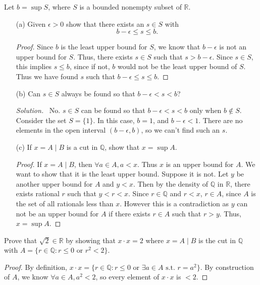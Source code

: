 \documentclass[12pt]{article}
\newcommand{\bbQ}{\mathbb{Q}}
\newcommand{\bbR}{\mathbb{R}}
\renewcommand{\_}[1]{\underline{ #1 }}
\theoremstyle{definition}
\newenvironment{exercise}[1]
  {\renewcommand\theinnercustomthm{#1}\innercustomthm}
  {\endinnercustomthm}
\newenvironment{solution}{\par\noindent\textit{Solution.}\ }{\par}
\numberwithin{equation}{subsection}
\begin{document}
\begin{exercise}{13}
    Let $b = \sup S$, where $S$ is a bounded nonempty subset of $\bbR$. 
    \begin{itemize}
        \item [(a)] Given $\epsilon > 0$ show that there exists an $s \in S$ with $$b - \epsilon \le s \le b.$$
        \begin{proof}
            Since $b$ is the least upper bound for $S$, we know that $b - \epsilon$ is not an upper bound for $S$. Thus, there exists $s \in S$ such that $s > b - \epsilon$. Since $s \in S$, this implies $s \le b$, since if not, $b$ would not be the least upper bound of $S$. Thus we have found $s$ such that $b - \epsilon \le s \le b$. 
        \end{proof}
        \item [(b)] Can $s \in S$ always be found so that $b - \epsilon < s < b$?
        \begin{solution}
            No. $s \in S$ can be found so that $b - \epsilon < s < b$ only when $b \notin S$. Consider the set $S = \{ 1 \}$. In this case, $b = 1$, and $b - \epsilon < 1$. There are no elements in the open interval $(b - \epsilon, b)$, so we can't find such an $s$. 
        \end{solution}
        \item [(c)] If $x = A \mid B$ is a cut in $\bbQ$, show that $x = \sup A$. 
        \begin{proof}
            If $x = A \mid B$, then $\forall a \in A, a < x$. Thus $x$ is an upper bound for $A$. We want to show that it is the least upper bound. Suppose it is not. Let $y$ be another upper bound for $A$ and $y < x$. Then by the density of $\bbQ$ in $\bbR$, there exists rational $r$ such that $y < r < x$. Since $r \in \bbQ$ and $r < x$, $r \in A$, since $A$ is the set of all rationals less than $x$. However this is a contradiction as $y$ can not be an upper bound for $A$ if there exists $r \in A$ such that $r > y$. Thus, $x = \sup A$.  
        \end{proof}
    \end{itemize}
\end{exercise}

\begin{exercise}{14}
    Prove that $\sqrt{2} \in \bbR$ by showing that $x \cdot x = 2$ where $x = A \mid B$ is the cut in $\bbQ$ with $A = \{ r \in \bbQ : r \le 0 \text{ or } r^2 < 2 \}$.
\end{exercise}
\begin{proof}
    By definition, $x \cdot x = \{ r \in \bbQ : r \le 0 \text{ or } \exists a \in A \text{ s.t. } r = a^2 \} $. By construction of $A$, we know $\forall a \in A, a^2 < 2$, so every element of $x \cdot x$ is $< 2$. 
\end{proof}
\end{document}
